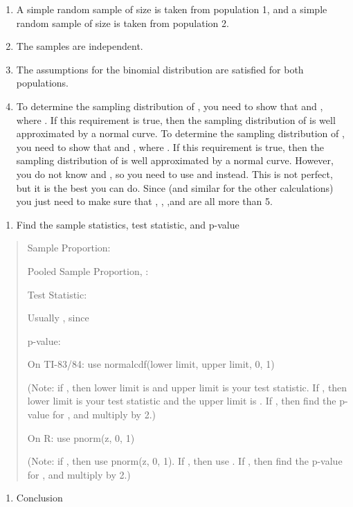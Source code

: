 \documentclass[]{book}
\providecommand{\tightlist}{%
  \setlength{\itemsep}{0pt}\setlength{\parskip}{0pt}}
\begin{document}
\begin{enumerate}
\def\labelenumi{\alph{enumi}.}
\item
  A simple random sample of size is taken from population 1, and a
  simple random sample of size is taken from population 2.
\item
  The samples are independent.
\item
  The assumptions for the binomial distribution are satisfied for both
  populations.
\item
  To determine the sampling distribution of , you need to show that
  and , where . If this requirement is true, then the sampling
  distribution of is well approximated by a normal curve. To determine
  the sampling distribution of , you need to show that and , where .
  If this requirement is true, then the sampling distribution of is
  well approximated by a normal curve. However, you do not know and ,
  so you need to use and instead. This is not perfect, but it is the
  best you can do. Since (and similar for the other calculations) you
  just need to make sure that , , ,and are all more than 5.
\end{enumerate}

\begin{enumerate}
\def\labelenumi{\arabic{enumi}.}
\setcounter{enumi}{3}
\tightlist
\item
  Find the sample statistics, test statistic, and p-value
\end{enumerate}

\begin{quote}
Sample Proportion:

Pooled Sample Proportion, :

Test Statistic:

Usually , since

p-value:

On TI-83/84: use normalcdf(lower limit, upper limit, 0, 1)

(Note: if , then lower limit is and upper limit is your test
statistic. If , then lower limit is your test statistic and the upper
limit is . If , then find the p-value for , and multiply by 2.)

On R: use pnorm(z, 0, 1)

(Note: if , then use pnorm(z, 0, 1). If , then use . If , then find
the p-value for , and multiply by 2.)
\end{quote}

\begin{enumerate}
\def\labelenumi{\arabic{enumi}.}
\setcounter{enumi}{4}
\tightlist
\item
  Conclusion
\end{enumerate}
\end{document}
